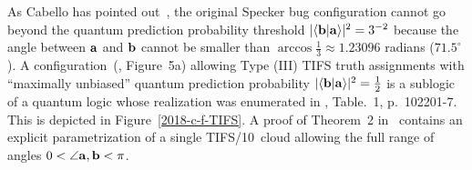 \begin{enumerate}[leftmargin=2.3em,labelsep=4mm]
As Cabello has pointed out~\cite{cabello-1994,Cabello-1996-diss}, the original Specker bug configuration cannot go beyond
the quantum prediction probability threshold $\vert \langle {\bf b} \vert {\bf a} \rangle \vert^2 = 3^{-2}$
because the angle between ${\bf a}$ and ${\bf b}$ cannot be smaller than
$\arccos {\frac{1}{3}} \approx 1.23096$ radians ($71.5^\circ$).
A configuration~(\cite{svozil-2018-whycontexts}, Figure~5a) allowing Type (III) TIFS truth assignments
with ``maximally unbiased''
quantum prediction probability $\vert \langle {\bf b} \vert {\bf a} \rangle \vert^2 = \frac{1}{2}$
is a sublogic of a quantum logic
whose realization was enumerated in \cite{2015-AnalyticKS}, Table.~1, p.~102201-7.
This is depicted in Figure~\ref{2018-c-f-TIFS}.
A proof of Theorem~2 in~\cite{Ramanathan-18} contains an explicit parametrization of a single
TIFS/10~cloud allowing the full range of angles $0 < \angle {\bf a},{\bf b} < \pi$.
\begin{figure}[H]
\newif\iflabel \labelfalse
\begin{center}
\end{center}
\end{figure}
\end{enumerate}
